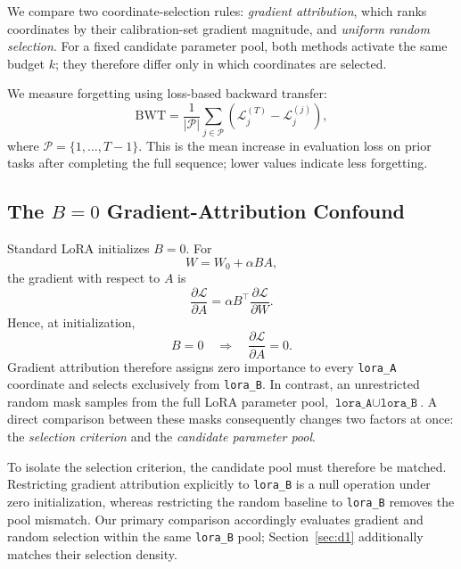 We compare two coordinate-selection rules: \emph{gradient attribution},
which ranks coordinates by their calibration-set gradient magnitude, and
\emph{uniform random selection}. For a fixed candidate parameter pool,
both methods activate the same budget $k$; they therefore differ only in
which coordinates are selected.

We measure forgetting using loss-based backward transfer:
\begin{equation}
\label{eq:bwt}
\mathrm{BWT}
=
\frac{1}{|\mathcal{P}|}
\sum_{j \in \mathcal{P}}
\left(
\mathcal{L}_j^{(T)}-\mathcal{L}_j^{(j)}
\right),
\end{equation}
where $\mathcal{P}=\{1,\dots,T-1\}$. This is the mean increase in
evaluation loss on prior tasks after completing the full sequence;
lower values indicate less forgetting.


\subsection{The $B=0$ Gradient-Attribution Confound}
\label{sec:b0}

Standard LoRA initializes $B=0$. For
\begin{equation}
    W = W_0 + \alpha BA,
\end{equation}
the gradient with respect to $A$ is
\begin{equation}
\label{eq:a_grad}
    \frac{\partial \mathcal{L}}{\partial A}
    =
    \alpha B^\top
    \frac{\partial \mathcal{L}}{\partial W}.
\end{equation}
Hence, at initialization,
\begin{equation}
    B=0
    \quad\Longrightarrow\quad
    \frac{\partial \mathcal{L}}{\partial A}=0.
\end{equation}
Gradient attribution therefore assigns zero importance to every
\texttt{lora\_A} coordinate and selects exclusively from
\texttt{lora\_B}. In contrast, an unrestricted random mask samples from
the full LoRA parameter pool, $\texttt{lora\_A}\cup\texttt{lora\_B}$.
A direct comparison between these masks consequently changes two factors
at once: the \emph{selection criterion} and the \emph{candidate parameter
pool}.

To isolate the selection criterion, the candidate pool must therefore be
matched. Restricting gradient attribution explicitly to
\texttt{lora\_B} is a null operation under zero initialization, whereas
restricting the random baseline to \texttt{lora\_B} removes the pool
mismatch. Our primary comparison accordingly evaluates gradient and
random selection within the same \texttt{lora\_B} pool; Section~\ref{sec:d1}
additionally matches their selection density.

